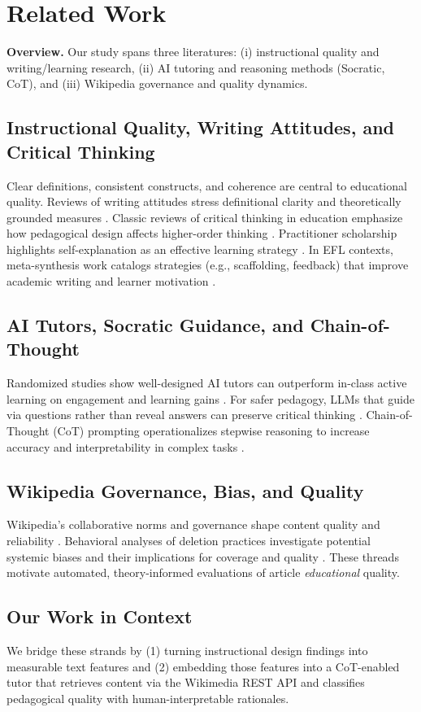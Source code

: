 \section{Related Work}
\label{sec:related}

\textbf{Overview.} Our study spans three literatures: (i) instructional quality and writing/learning research, (ii) AI tutoring and reasoning methods (Socratic, CoT), and (iii) Wikipedia governance and quality dynamics.

\subsection{Instructional Quality, Writing Attitudes, and Critical Thinking}
Clear definitions, consistent constructs, and coherence are central to educational quality. Reviews of writing attitudes stress definitional clarity and theoretically grounded measures \cite{ekholm2018clarifying}. Classic reviews of critical thinking in education emphasize how pedagogical design affects higher-order thinking \cite{pithers2000critical}. Practitioner scholarship highlights self-explanation as an effective learning strategy \cite{catlr2019selfexplanation}. In EFL contexts, meta-synthesis work catalogs strategies (e.g., scaffolding, feedback) that improve academic writing and learner motivation \cite{fadhly2022efl}.

\subsection{AI Tutors, Socratic Guidance, and Chain-of-Thought}
Randomized studies show well-designed AI tutors can outperform in-class active learning on engagement and learning gains \cite{kestin2025aitutor}. For safer pedagogy, LLMs that guide via questions rather than reveal answers can preserve critical thinking \cite{ding2024socratic}. Chain-of-Thought (CoT) prompting operationalizes stepwise reasoning to increase accuracy and interpretability in complex tasks \cite{ibm2025cot}.

\subsection{Wikipedia Governance, Bias, and Quality}
Wikipedia’s collaborative norms and governance shape content quality and reliability \cite{reagle2010good}. Behavioral analyses of deletion practices investigate potential systemic biases and their implications for coverage and quality \cite{worku2020exploring}. These threads motivate automated, theory-informed evaluations of article \emph{educational} quality.

\subsection{Our Work in Context}
We bridge these strands by (1) turning instructional design findings into measurable text features and (2) embedding those features into a CoT-enabled tutor that retrieves content via the Wikimedia REST API and classifies pedagogical quality with human-interpretable rationales.

